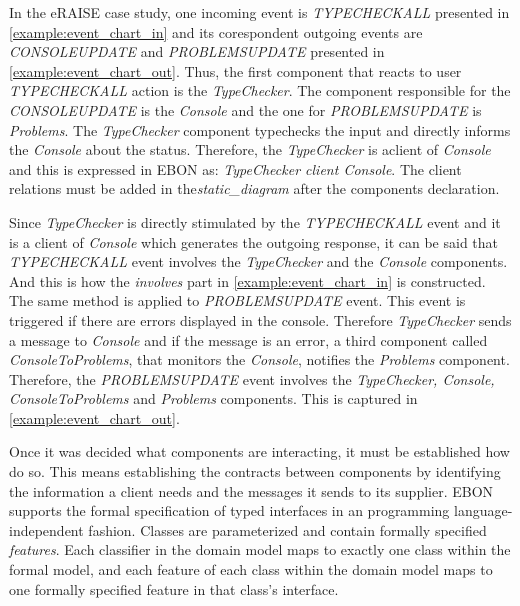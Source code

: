 \documentclass[conference]{IEEEtran}
\newcommand{\note}[1]{\todo[inline,color=red!40]{#1}}
\begin{document}
In the eRAISE case study, one incoming event is \emph{TYPECHECKALL}
presented in \autoref{example:event_chart_in} and its corespondent
outgoing events are \emph{CONSOLEUPDATE} and \emph{PROBLEMSUPDATE}
presented in \autoref{example:event_chart_out}.  Thus, the first
component that reacts to user \emph{TYPECHECKALL} action is the
\emph{TypeChecker}. The component responsible for the
\emph{CONSOLEUPDATE} is the \emph{Console} and the one for
\emph{PROBLEMSUPDATE} is \emph{Problems}. The \emph{TypeChecker}
component typechecks the input and directly informs the \emph{Console}
about the status.  Therefore, the \emph{TypeChecker} is aclient of
\emph{Console} and this is expressed in EBON as: \emph{ TypeChecker
  client Console}. The client relations must be added in
the\emph{static\_diagram} after the components declaration.


Since \emph{TypeChecker} is directly stimulated by the
\emph{TYPECHECKALL} event and it is a client of \emph{Console} which
generates the outgoing response, it can be said that\emph{
TYPECHECKALL} event involves the \emph{TypeChecker} and the
\emph{Console} components. And this is how the \emph{involves} part in
\autoref{example:event_chart_in} is constructed. The same method is
applied to \emph{PROBLEMSUPDATE} event. This event is triggered if
there are errors displayed in the console. Therefore
\emph{TypeChecker} sends a message to \emph{Console} and if the
message is an error, a third component called \emph{ConsoleToProblems},
that monitors the \emph{Console}, notifies the \emph{Problems}
component. Therefore, the \emph{PROBLEMSUPDATE} event involves the
\emph{TypeChecker, Console, ConsoleToProblems} and \emph{Problems}
components. This is captured in \autoref{example:event_chart_out}.



Once it was decided what components are interacting, it must be
established how do so.  This means establishing the contracts between
components by identifying the information a client needs and the
messages it sends to its supplier.  EBON supports the formal
specification of typed interfaces in an programming
language-independent fashion.  Classes are parameterized and contain
formally specified \emph{features}.  Each classifier in the domain
model maps to exactly one class within the formal model, and each
feature of each class within the domain model maps to one formally
specified feature in that class's interface.
\end{document}

